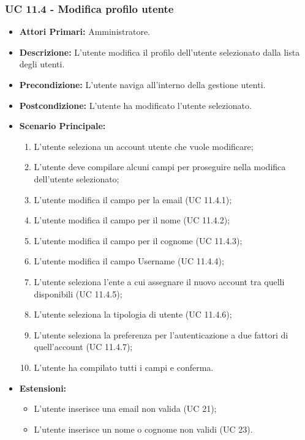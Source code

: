 			\subsubsection{UC 11.4 - Modifica profilo utente}
			\begin{itemize}
				\item \textbf{Attori Primari:} Amministratore.
				\item \textbf{Descrizione:} L'utente modifica il profilo dell'utente selezionato dalla lista degli utenti.
				\item \textbf{Precondizione:} L'utente naviga all'interno della gestione utenti.
				\item \textbf{Postcondizione:} L'utente ha modificato l'utente selezionato.
				\item \textbf{Scenario Principale:}
				\begin{enumerate}
					\item L'utente seleziona un account utente che vuole modificare;
					\item L'utente deve compilare alcuni campi per proseguire nella modifica dell'utente selezionato;
					\item{L'utente modifica il campo per la email (UC 11.4.1);}
					\item{L'utente modifica il campo per il nome (UC 11.4.2);}
					\item{L'utente modifica il campo per il cognome (UC 11.4.3);}
					\item{L'utente modifica il campo Username  (UC 11.4.4);}
					\item{L'utente seleziona l'ente a cui assegnare il nuovo account tra quelli disponibili (UC 11.4.5);}
					\item{L'utente seleziona la tipologia di utente (UC 11.4.6);}
					\item{L'utente seleziona la preferenza per l'autenticazione a due fattori di quell'account (UC 11.4.7);}
					\item{L'utente ha compilato tutti i campi e conferma.}
				\end{enumerate}	
				\item \textbf{Estensioni:}
				\begin{itemize}
					\item L'utente inserisce una email non valida (UC 21);
					\item L'utente inserisce un nome o cognome non validi (UC 23).
				\end{itemize}
			\end{itemize}
			
